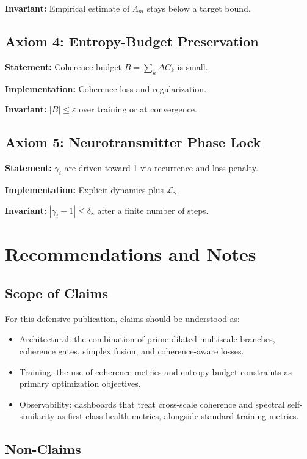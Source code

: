 \documentclass[11pt]{article}
\begin{document}
\textbf{Invariant:} Empirical estimate of $\Lambda_m$ stays below a target bound.

\subsection*{Axiom 4: Entropy-Budget Preservation}

\textbf{Statement:} Coherence budget $B = \sum_k \Delta C_k$ is small.

\textbf{Implementation:} Coherence loss and regularization.

\textbf{Invariant:} $|B| \le \varepsilon$ over training or at convergence.

\subsection*{Axiom 5: Neurotransmitter Phase Lock}

\textbf{Statement:} $\gamma_i$ are driven toward 1 via recurrence and loss penalty.

\textbf{Implementation:} Explicit dynamics plus $\mathcal{L}_\gamma$.

\textbf{Invariant:} $|\gamma_i - 1| \le \delta_\gamma$ after a finite number of steps.

\section{Recommendations and Notes}

\subsection{Scope of Claims}

For this defensive publication, claims should be understood as:

\begin{itemize}
  \item Architectural: the combination of prime-dilated multiscale branches, coherence gates, simplex fusion, and coherence-aware losses.
  \item Training: the use of coherence metrics and entropy budget constraints as primary optimization objectives.
  \item Observability: dashboards that treat cross-scale coherence and spectral self-similarity as first-class health metrics, alongside standard training metrics.
\end{itemize}

\subsection{Non-Claims}
\end{document}
